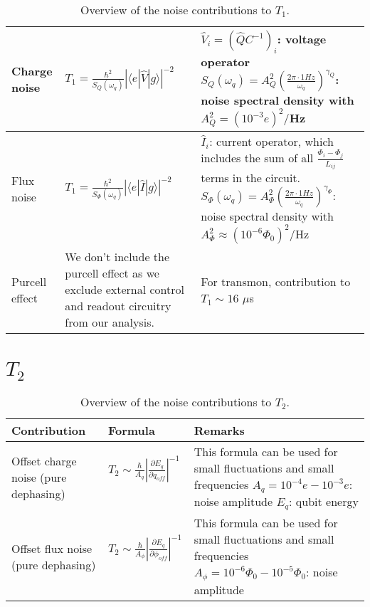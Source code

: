\documentclass[]{article}
\newcommand{\ket}[1]{| #1 \rangle}
\newcommand{\bra}[1]{\langle #1 |}
\begin{document}
\begin{table}[h]
\begin{tabular}{|p{2cm}|p{5.5cm}|p{7.5cm}|}
\hline 
Charge noise & $T_1 = \frac{\hbar^2}{S_{Q}(\omega_q)} \left| \bra{e} \hat{V} \ket{g} \right|^{-2}$~\cite{yan2016}
& $\hat{V}_i=\left(\hat{Q}C^{-1} \right)_i$: voltage operator \newline 
$S_{Q}(\omega_q)=A_Q^2\left( \frac{2\pi \cdot 1 Hz}{\omega_q} \right)^{\gamma_Q}$: noise spectral density with $A_Q^2=(10^{-3}e)^2/$Hz~\cite{krantz2019} \\
\hline
Flux noise & $T_1 = \frac{\hbar^2}{S_{\Phi}(\omega_q)} \left| \bra{e} \hat{I} \ket{g} \right|^{-2}$~\cite{yan2016}
& $\hat{I}_i$: current operator, which includes the sum of all $\frac{\Phi_i-\Phi_j}{L_{ij}}$ terms in the circuit. \newline 
$S_{\Phi}(\omega_q)=A_{\Phi}^2\left( \frac{2\pi \cdot 1 Hz}{\omega_q} \right)^{\gamma_{\Phi}}$: noise spectral density with $A_{\Phi}^2\approx(10^{-6} \Phi_0)^2/$Hz~\cite{krantz2019} \\
\hline
Purcell effect & We don't include the purcell effect as we exclude external control and readout circuitry from our analysis. 
& For transmon, contribution to  $T_1 \sim 16$ $\mu$s~\cite{koch2007}  \\
\hline

\end{tabular} 
\caption{Overview of the noise contributions to $T_1$.}
\label{tab:T_1}
\end{table}


\section{$T_2$}
\begin{table}[h]
\centering
\begin{tabular}{|p{2cm}|p{5.5cm}|p{7.5cm}|}
	\hline 
Contribution	& Formula & Remarks \\ 
	\hline \hline 
Offset charge noise (pure dephasing)& $T_2 \sim \frac{\hbar}{A_q} \left| \frac{\partial E_q}{\partial q_{off}} \right|^{-1} $~\cite{koch2007} & This formula can be used for small fluctuations and small frequencies \newline
 $A_q = 10^{-4}e - 10^{-3}e$: noise amplitude \newline
 $E_q$: qubit energy \\
\hline 
Offset flux noise (pure dephasing)& $T_2 \sim \frac{\hbar}{A_{\phi}} \left| \frac{\partial E_q}{\partial \phi_{off}} \right|^{-1} $~\cite{koch2007} & This formula can be used for small fluctuations and small frequencies \newline
 $A_{\phi}= 10^{-6}\Phi_0 - 10^{-5}\Phi_0$: noise amplitude \\
\hline 
\end{tabular} 
\caption{Overview of the noise contributions to $T_2$.}
\label{tab:T_2}
\end{table}




\end{document}
